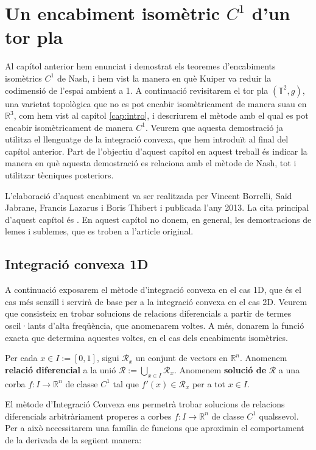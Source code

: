 \chapter{Un encabiment isomètric $C^1$ d'un tor pla}

Al capítol anterior hem enunciat i demostrat els teoremes d'encabiments isomètrics $C^1$ de Nash, i hem vist la manera en què Kuiper va reduir la codimensió de l'espai ambient a 1. A continuació revisitarem el tor pla $(\mathbb T^2, g)$, una varietat topològica que no es pot encabir isomètricament de manera suau en $\mathbb R^3$, com hem vist al capítol \ref{cap:intro}, i descriurem el mètode amb el qual es pot encabir isomètricament de manera $C^1$. 
Veurem que aquesta demostració ja utilitza el llenguatge de la integració convexa, que hem introduït al final del capítol anterior. Part de l'objectiu d'aquest capítol en aquest treball és indicar la manera en què aquesta demostració es relaciona amb el mètode de Nash, tot i utilitzar tècniques posteriors.

L'elaboració d'aquest encabiment va ser realitzada per Vincent Borrelli, Saïd Jabrane, Francis Lazarus i Boris Thibert i publicada l'any 2013. La cita principal d'aquest capítol és \cite{borrelli2013}. En aquest capítol no donem, en general, les demostracions de lemes i sublemes, que es troben a l'article original.

\section{Integració convexa 1D}
A continuació exposarem el mètode d'integració convexa en el cas 1D, que és el cas més senzill i servirà de base per a la integració convexa en el cas 2D. Veurem que consisteix en trobar solucions de relacions diferencials a partir de termes oscil·lants d'alta freqüència, que anomenarem voltes. A més, donarem la funció exacta que determina aquestes voltes, en el cas dels encabiments isomètrics.

\begin{defi}
    Per cada $x\in I := [0,1]$, sigui $\mathcal R_x$ un conjunt de vectors en $\mathbb R^n$. Anomenem \textbf{relació diferencial} a la unió $\mathcal R := \bigcup_{x\in I} \mathcal R_x$. Anomenem \textbf{solució de} $\mathcal R$ a una corba $f:I\to\mathbb R^n$ de classe $C^1$ tal que $f'(x)\in\mathcal R_x$ per a tot $x\in I$.
\end{defi}

El mètode d'Integració Convexa ens permetrà trobar solucions de relacions diferencials arbitràriament properes a corbes $f:I\to\mathbb R^n$ de classe $C^1$ qualssevol. Per a això necessitarem una família de funcions que aproximin el comportament de la derivada de la següent manera:


